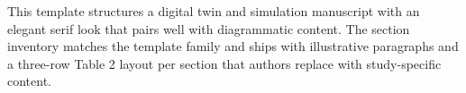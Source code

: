 
This template structures a digital twin and simulation manuscript with an elegant serif look that pairs well with diagrammatic content. The section inventory matches the template family and ships with illustrative paragraphs and a three-row Table 2 layout per section that authors replace with study-specific content.
